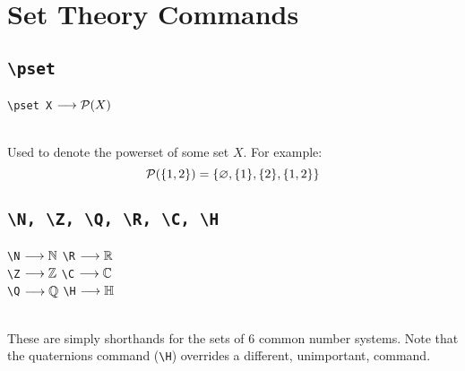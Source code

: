 \documentclass{article}
\begin{document}
\section{Set Theory Commands}
\subsection{\texttt{\textbackslash pset}}
\texttt{\textbackslash pset X} $\longrightarrow\mathcal P(X)$

\noindent\\Used to denote the powerset of some set $X$. For example:
$$\mathcal P(\{1,2\})=\{\varnothing,\{1\},\{2\},\{1,2\}\}$$

\subsection{\texttt{\textbackslash N, \textbackslash Z, \textbackslash Q, \textbackslash R, \textbackslash C, \textbackslash H}}
\texttt{\textbackslash N} $\longrightarrow\mathbb N$\quad
\texttt{\textbackslash R} $\longrightarrow\mathbb R$\\
\texttt{\textbackslash Z} $\longrightarrow\mathbb Z$\quad
\texttt{\textbackslash C} $\longrightarrow\mathbb C$\\
\texttt{\textbackslash Q} $\longrightarrow\mathbb Q$\quad
\texttt{\textbackslash H} $\longrightarrow\mathbb H$

\noindent\\These are simply shorthands for the sets of 6 common number systems. Note that the quaternions command (\texttt{\textbackslash H}) overrides a different, unimportant, command.
\end{document}
